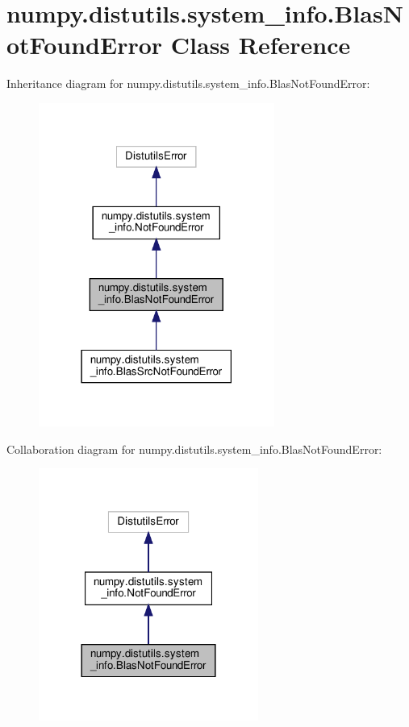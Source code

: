 \hypertarget{classnumpy_1_1distutils_1_1system__info_1_1BlasNotFoundError}{}\section{numpy.\+distutils.\+system\+\_\+info.\+Blas\+Not\+Found\+Error Class Reference}
\label{classnumpy_1_1distutils_1_1system__info_1_1BlasNotFoundError}


Inheritance diagram for numpy.\+distutils.\+system\+\_\+info.\+Blas\+Not\+Found\+Error\+:
\nopagebreak
\begin{figure}[H]
\begin{center}
\leavevmode
\includegraphics[width=219pt]{classnumpy_1_1distutils_1_1system__info_1_1BlasNotFoundError__inherit__graph}
\end{center}
\end{figure}


Collaboration diagram for numpy.\+distutils.\+system\+\_\+info.\+Blas\+Not\+Found\+Error\+:
\nopagebreak
\begin{figure}[H]
\begin{center}
\leavevmode
\includegraphics[width=204pt]{classnumpy_1_1distutils_1_1system__info_1_1BlasNotFoundError__coll__graph}
\end{center}
\end{figure}


